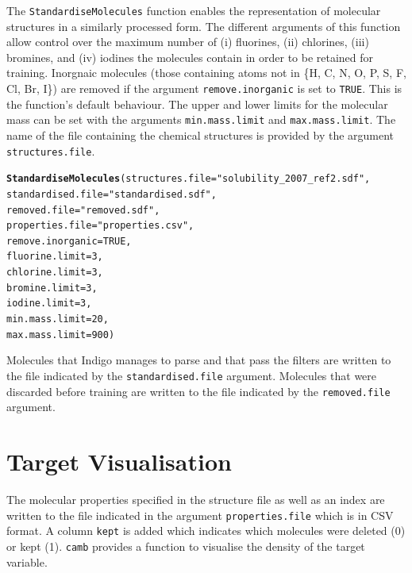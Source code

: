 \documentclass[twoside,a4wide,12pt]{article}\usepackage[]{graphicx}\usepackage[]{color}
\makeatletter
\newcommand{\hlnum}[1]{\textcolor[rgb]{0.686,0.059,0.569}{#1}}%
\newcommand{\hlstr}[1]{\textcolor[rgb]{0.192,0.494,0.8}{#1}}%
\newcommand{\hlstd}[1]{\textcolor[rgb]{0.345,0.345,0.345}{#1}}%
\newcommand{\hlkwc}[1]{\textcolor[rgb]{0.333,0.667,0.333}{#1}}%
\newcommand{\hlkwd}[1]{\textcolor[rgb]{0.737,0.353,0.396}{\textbf{#1}}}%
\newenvironment{kframe}{%
 \def\at@end@of@kframe{}%
 \ifinner\ifhmode%
  \def\at@end@of@kframe{\end{minipage}}%
  \begin{minipage}{\columnwidth}%
 \fi\fi%
 \def\FrameCommand##1{\hskip\@totalleftmargin \hskip-\fboxsep
 \colorbox{shadecolor}{##1}\hskip-\fboxsep
     \hskip-\linewidth \hskip-\@totalleftmargin \hskip\columnwidth}%
 \MakeFramed {\advance\hsize-\width
   \@totalleftmargin\z@ \linewidth\hsize
   \@setminipage}}%
 {\par\unskip\endMakeFramed%
 \at@end@of@kframe}
\newenvironment{knitrout}{}{} %
\makeatother
\begin{document}
The \texttt{StandardiseMolecules} function enables the representation of molecular structures in a similarly processed form.
The different arguments of this function allow control over the maximum number of (i) fluorines, (ii) chlorines,
(iii) bromines, and (iv) iodines the molecules contain in order to be retained for training.
Inorgnaic molecules (those containing atoms not in \{H, C, N, O, P, S, F, Cl, Br, I\}) are removed if the argument \texttt{remove.inorganic} is set to \texttt{TRUE}. This is the function's default behaviour.
The upper and lower limits for the molecular mass can be set with the arguments \texttt{min.mass.limit} and \texttt{max.mass.limit}.
The name of the file containing the chemical structures is provided by the argument \texttt{structures.file}.
\begin{knitrout}
\color{fgcolor}\begin{kframe}
\begin{alltt}
\hlkwd{StandardiseMolecules}\hlstd{(}\hlkwc{structures.file}\hlstd{=}\hlstr{"solubility_2007_ref2.sdf"}\hlstd{,}
                     \hlkwc{standardised.file}\hlstd{=}\hlstr{"standardised.sdf"}\hlstd{,}
                     \hlkwc{removed.file}\hlstd{=}\hlstr{"removed.sdf"}\hlstd{,}
                     \hlkwc{properties.file} \hlstd{=} \hlstr{"properties.csv"}\hlstd{,}
                     \hlkwc{remove.inorganic}\hlstd{=}\hlnum{TRUE}\hlstd{,}
                     \hlkwc{fluorine.limit}\hlstd{=}\hlnum{3}\hlstd{,}
                     \hlkwc{chlorine.limit}\hlstd{=}\hlnum{3}\hlstd{,}
                     \hlkwc{bromine.limit}\hlstd{=}\hlnum{3}\hlstd{,}
                     \hlkwc{iodine.limit}\hlstd{=}\hlnum{3}\hlstd{,}
                     \hlkwc{min.mass.limit}\hlstd{=}\hlnum{20}\hlstd{,}
                     \hlkwc{max.mass.limit}\hlstd{=}\hlnum{900}\hlstd{)}
\end{alltt}
\end{kframe}
\end{knitrout}
Molecules that Indigo manages to parse and that pass the filters are written to the file indicated by the \texttt{standardised.file} argument. Molecules that were discarded before training are written to the file indicated by the \texttt{removed.file} argument.

\section{Target Visualisation}
The molecular properties specified in the structure file as well as an index are written to the file indicated in the argument \texttt{properties.file} which is in CSV format. A column \texttt{kept} is added which indicates which molecules were deleted (0) or kept (1). \texttt{camb} provides a function to visualise the density of the target variable.
\end{document}
